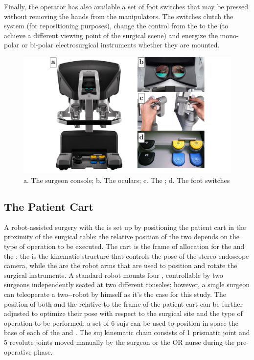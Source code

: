 \documentclass[../main.tex]{subfiles}
\begin{document}
Finally, the operator has also available a set of foot switches that may be pressed without removing the hands from the manipulators. The switches clutch the system (for repositioning purposes), change the control from the \psms to the \ecm (to achieve a different viewing point of the surgical scene) and energize the mono-polar or bi-polar electrosurgical instruments whether they are mounted.

\begin{figure}
    \centering
    \includegraphics[width=\textwidth]{images/surgeon_cart_panel.png}
    \caption{a. The \davinci surgeon console; b. The \hrsv oculars; c. The \mtms; d. The foot switches}
    \label{fig:surgeonconsolepanel}
\end{figure}

\subsection{The Patient Cart}
A robot-assisted surgery with the \davinci is set up by positioning the patient cart in the proximity of the surgical table: the relative position of the two depends on the type of operation to be executed. 
The cart is the frame of allocation for the \psms and the \ecm: the \ecm is the kinematic structure that controls the pose of the stereo endoscope camera, while the \psms are the robot arms that are used to position and rotate the surgical instruments. A standard \davinci robot mounts four \psms, controllable by two surgeons independently seated at two different consoles; however, a single surgeon can teleoperate a two-\psms-robot by himself as it's the case for this study.
The position of both \psms and the \ecm relative to the frame of the patient cart can be further adjusted to optimize their pose with respect to the surgical site and the type of operation to be performed: a set of 6 \acp{suj} can be used to position in space the base of each of the \psms and \ecm. The \ac{suj} kinematic chain consists of 1 prismatic joint and 5 revolute joints moved manually by the surgeon or the OR nurse during the pre-operative phase.
\end{document}
